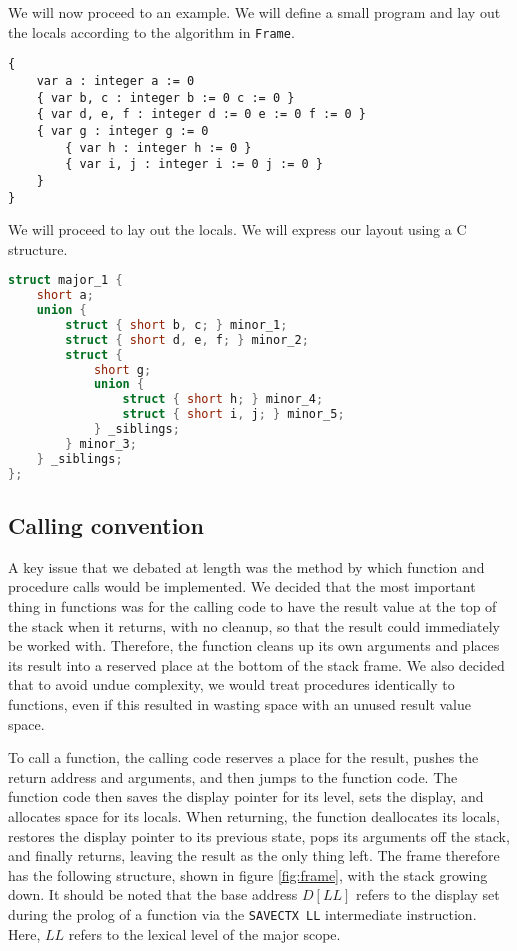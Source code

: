 \documentclass[oneside]{amsart}
\theoremstyle{definition}
\theoremstyle{remark}
\numberwithin{equation}{section}
\begin{document}
We will now proceed to an example. We will define a small program and lay out the locals according
to the algorithm in \texttt{Frame}.
\begin{lstlisting}[caption=Major scope in 488]
{
    var a : integer a := 0
    { var b, c : integer b := 0 c := 0 }
    { var d, e, f : integer d := 0 e := 0 f := 0 }
    { var g : integer g := 0
        { var h : integer h := 0 }
        { var i, j : integer i := 0 j := 0 }
    }
}
\end{lstlisting}

\noindent We will proceed to lay out the locals. We will express our layout using a C structure.
\begin{lstlisting}[caption=Layout as C structure, language=C, directivestyle={\color{black}} emph={short}, emphstyle={\color{blue}}]
struct major_1 {
    short a;
    union {
        struct { short b, c; } minor_1;
        struct { short d, e, f; } minor_2;
        struct {
            short g;
            union {
                struct { short h; } minor_4;
                struct { short i, j; } minor_5;
            } _siblings;
        } minor_3;
    } _siblings;
};
\end{lstlisting}

\subsection{Calling convention}
A key issue that we debated at length was the method by which function and procedure calls would be
implemented. We decided that the most important thing in functions was for the calling code  to have
the result value at the top of the stack when it returns, with no cleanup, so that the result could
immediately be worked with. Therefore, the function cleans up its own arguments and places its
result into a reserved place at the bottom of the stack frame. We also decided that to avoid undue
complexity, we would treat procedures identically to functions, even if this resulted in wasting
space with an unused result value space.

To call a function, the calling code reserves a place for the result, pushes the return address and
arguments, and then jumps to the function code. The function code then saves the display pointer for
its level, sets the display, and allocates space for its locals. When returning, the function
deallocates its locals, restores the display pointer to its previous state, pops its arguments off
the stack, and finally returns, leaving the result as the only thing left. The frame therefore has
the following structure, shown in figure \ref{fig:frame}, with the stack growing down. It should be
noted that the base address $D[LL]$ refers to the display set during the prolog of a function via
the \texttt{SAVECTX LL} intermediate instruction. Here, $LL$ refers to the lexical level of the
major scope.
\end{document}
